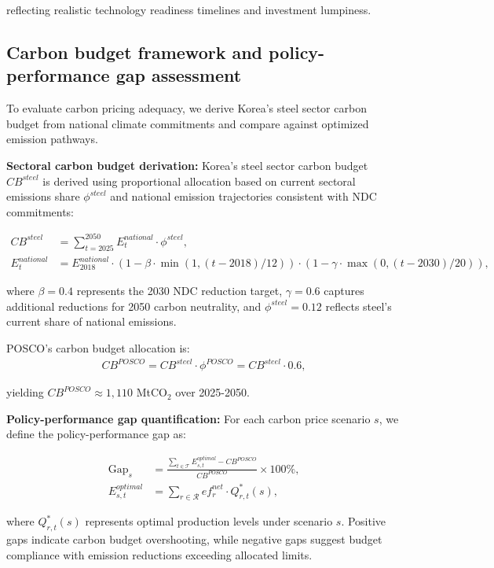 \documentclass[preprint,5p,authoryear]{elsarticle}
\begin{document}
reflecting realistic technology readiness timelines and investment lumpiness.

\subsection{Carbon budget framework and policy-performance gap assessment}

To evaluate carbon pricing adequacy, we derive Korea's steel sector carbon budget from national climate commitments and compare against optimized emission pathways.

\textbf{Sectoral carbon budget derivation:}
Korea's steel sector carbon budget $CB^{steel}$ is derived using proportional allocation based on current sectoral emissions share $\phi^{steel}$ and national emission trajectories consistent with NDC commitments:

\begin{align}
CB^{steel} &= \sum_{t=2025}^{2050} E^{national}_t \cdot \phi^{steel}, \label{eq:budget_total}\\
E^{national}_t &= E^{national}_{2018} \cdot (1 - \beta \cdot \min(1, (t-2018)/12)) \cdot (1 - \gamma \cdot \max(0, (t-2030)/20)), \label{eq:national_trajectory}
\end{align}

where $\beta = 0.4$ represents the 2030 NDC reduction target, $\gamma = 0.6$ captures additional reductions for 2050 carbon neutrality, and $\phi^{steel} = 0.12$ reflects steel's current share of national emissions.

POSCO's carbon budget allocation is:
\begin{align}
CB^{POSCO} = CB^{steel} \cdot \phi^{POSCO} = CB^{steel} \cdot 0.6, \label{eq:posco_budget}
\end{align}

yielding $CB^{POSCO} \approx 1{,}110$ MtCO$_2$ over 2025-2050.

\textbf{Policy-performance gap quantification:}
For each carbon price scenario $s$, we define the policy-performance gap as:

\begin{align}
\text{Gap}_s &= \frac{\sum_{t \in \mathcal{T}} E_{s,t}^{optimal} - CB^{POSCO}}{CB^{POSCO}} \times 100\%, \label{eq:gap}\\
E_{s,t}^{optimal} &= \sum_{r \in \mathcal{R}} ef_r^{net} \cdot Q_{r,t}^*(s), \label{eq:optimal_emissions}
\end{align}

where $Q_{r,t}^*(s)$ represents optimal production levels under scenario $s$. Positive gaps indicate carbon budget overshooting, while negative gaps suggest budget compliance with emission reductions exceeding allocated limits.
\end{document}
